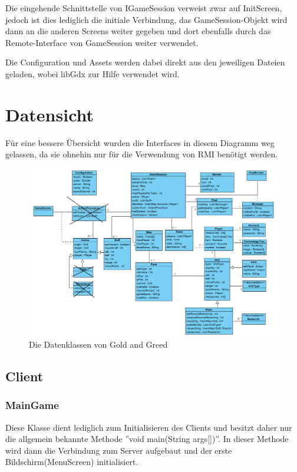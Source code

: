\documentclass[fontsize=12pt,paper=a4,twoside]{scrartcl}
\begin{document}
Die eingehende Schnittstelle von IGameSession verweist zwar auf InitScreen, jedoch ist dies lediglich die initiale Verbindung, das GameSession-Objekt wird dann an die anderen Screens weiter gegeben und dort ebenfalls durch das Remote-Interface von GameSession weiter verwendet.

Die Configuration und Assets werden dabei direkt aus den jeweiligen Dateien geladen, wobei libGdx zur Hilfe verwendet wird.

\section{Datensicht}
\label{sec:datensicht}

Für eine bessere Übersicht wurden die Interfaces in diesem Diagramm weg gelassen, da sie ohnehin nur für die Verwendung von RMI benötigt werden.

\begin{figure}[h]
\centering
\includegraphics[width=1.0\linewidth]{DatensichtForReal}
\caption{Die Datenklassen von Gold and Greed}
\label{fig:ClassDiagram1}
\end{figure}

\subsection{Client}

\subsubsection{MainGame}

Diese Klasse dient lediglich zum Initialisieren des Clients und besitzt daher nur die allgemein bekannte Methode ''void main(String args[])''. In dieser Methode wird dann die Verbindung zum Server aufgebaut und der erste Bildschirm(MenuScreen) initialisiert.
\end{document}
